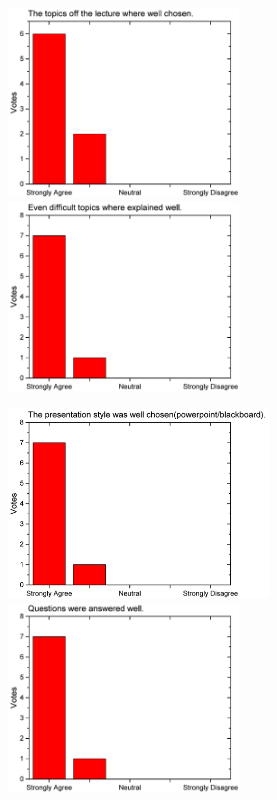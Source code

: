 \begin{figure}[H]
  \begin{minipage}{.48\linewidth}
    \centering
      {\includegraphics[height=50mm]{figures/n/Graph27.pdf}}
      {\includegraphics[height=50mm]{figures/n/Graph28.pdf}}
  \end{minipage}\quad
  \begin{minipage}{.48\linewidth}
    \centering
      {\includegraphics[height=50mm]{figures/n/Graph29.pdf}}
      {\includegraphics[height=50mm]{figures/n/Graph30.pdf}}
  \end{minipage}
\end{figure}

